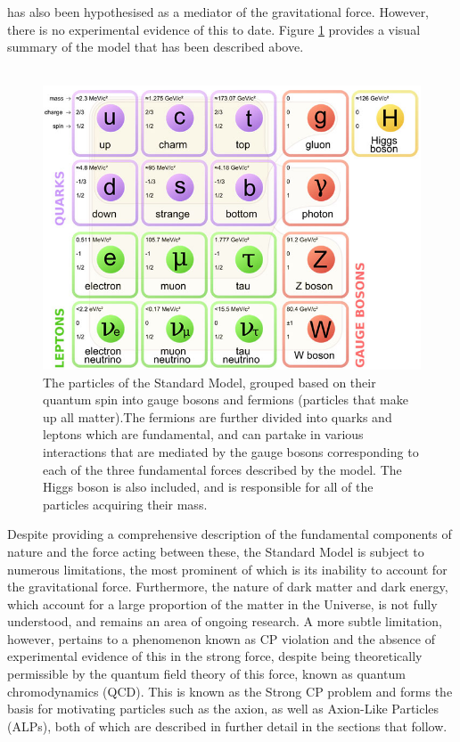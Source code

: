 has also been hypothesised as a mediator of the gravitational force. However, there is no experimental evidence of this to date. Figure \ref{StandardModel} provides a visual summary of the model that has been described above.\\
\\
\begin{figure}[H]
    \centering
    \includegraphics[scale = 0.4]{StandardModel.jpg}
    \caption{The particles of the Standard Model, grouped based on their quantum spin into gauge bosons and fermions (particles that make up all matter).The fermions are further divided into quarks and leptons which are fundamental, and can partake in various interactions that are mediated by the gauge bosons corresponding to each of the three fundamental forces described by the model. The Higgs boson is also included, and is responsible for all of the particles acquiring their mass.}
    \label{StandardModel}
\end{figure}
Despite providing a comprehensive description of the fundamental components of nature and the force acting between these, the Standard Model is subject to numerous limitations, the most prominent of which is its inability to account for the gravitational force. Furthermore, the nature of dark matter and dark energy, which account for
a large proportion of the matter in the Universe, is not fully understood, and remains an area of ongoing research. A more subtle limitation, however, pertains to a phenomenon known as CP violation and the absence of experimental evidence of this in the strong force, despite being theoretically permissible by the quantum field theory of this force,
known as quantum chromodynamics (QCD). This is known as the Strong CP problem and forms the basis for motivating particles such as the axion, as well as Axion-Like Particles (ALPs), both of which are described in further detail in the sections that follow.
